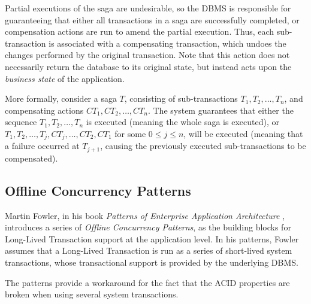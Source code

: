 Partial executions of the saga are undesirable, so the DBMS is
responsible for guaranteeing that either all transactions in a saga
are successfully completed, or compensation actions are run to amend
the partial execution. Thus, each sub-transaction is associated with a
compensating transaction, which undoes the changes performed by the
original transaction. Note that this action does not necessarily
return the database to its original state, but instead acts upon the
{\it business state} of the application.

More formally, consider a saga $T$, consisting of sub-transactions
$T_1, T_2, \ldots, T_n$, and compensating actions $CT_1, CT_2, \ldots,
CT_n$. The system guarantees that either the sequence $T_1, T_2,
\ldots, T_n$ is executed (meaning the whole saga is executed), or
$T_1, T_2, \ldots, T_j,CT_j, \ldots, CT_2, CT_1$ for some $0 \le j \le
n$, will be executed (meaning that a failure occurred at $T_{j+1}$,
causing the previously executed sub-transactions to be compensated).

\subsection{Offline Concurrency Patterns}

Martin Fowler, in his book {\it Patterns of Enterprise Application
  Architecture} \cite{fowler2003patterns}, introduces a series of {\it
  Offline Concurrency Patterns}, as the building blocks for Long-Lived
Transaction support at the application level. In his patterns, Fowler
assumes that a Long-Lived Transaction is run as a series of
short-lived system transactions, whose transactional support is
provided by the underlying DBMS.

The patterns provide a workaround for the fact that the ACID
properties are broken when using several system transactions.

